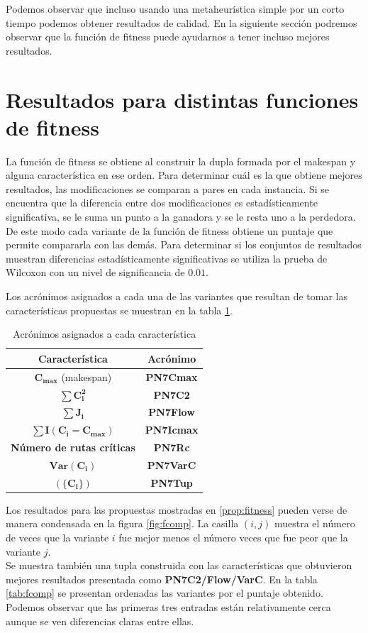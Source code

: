 Podemos observar que incluso usando una metaheurística simple por un corto tiempo podemos obtener resultados de calidad. En la siguiente sección podremos observar que la función de fitness puede ayudarnos a tener incluso mejores resultados.

\section{Resultados para distintas funciones de fitness}
  La función de fitness se obtiene al construir la dupla formada por el makespan y alguna característica en ese orden. Para determinar cuál es la que obtiene mejores resultados, las modificaciones se comparan a pares en cada instancia. Si se encuentra que la diferencia entre dos modificaciones es estadísticamente significativa, se le suma un punto a la ganadora y se le resta uno a la perdedora. De este modo cada variante de la función de fitness obtiene un puntaje que permite compararla con las demás.
Para determinar si los conjuntos de resultados muestran diferencias estadísticamente significativas se utiliza la prueba de Wilcoxon con un nivel de significancia de $0.01$. 

Los acrónimos asignados a cada una de las variantes que resultan de tomar las características propuestas se muestran en la tabla \ref{tab:caracter}.
\begin{table}[hbtp]
    \centering
\begin{tabular}{@{}cc@{}}
Característica                    & Acrónimo       \\ \hline \hline
$\mathbf{C_{max}}$ (makespan)     & \textbf{PN7Cmax}   \\\midrule
$\mathbf{\sum C_i^2}$             & \textbf{PN7C2}    \\\midrule
$\mathbf{\sum J_i}$               & \textbf{PN7Flow}  \\\midrule
$\mathbf{\sum I(C_i=C_{max})}$    & \textbf{PN7Icmax} \\\midrule
\textbf{Número de rutas críticas} & \textbf{PN7Rc}    \\\midrule
$\mathbf{Var(C_i)}$               & \textbf{PN7VarC}  \\\midrule
$\mathbf{(\{C_i\})}$              & \textbf{PN7Tup}    \\\midrule
\end{tabular}
    \caption{Acrónimos asignados a cada característica}
    \label{tab:caracter}
\end{table}

Los resultados para las propuestas mostradas en \ref{prop:fitness} pueden verse de manera condensada en la figura \ref{fig:fcomp}. La casilla $(i,j)$ muestra el número de veces que la variante $i$ fue mejor menos el número veces que fue peor que la variante $j$.\\
Se muestra también una tupla construida con las características que obtuvieron mejores resultados presentada como \textbf{PN7C2/Flow/VarC}. En la tabla \ref{tab:fcomp} se presentan ordenadas las variantes por el puntaje obtenido. Podemos observar que las primeras tres entradas están relativamente cerca aunque se ven diferencias claras entre ellas.\\

